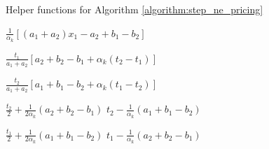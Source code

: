 \documentclass[10pt,a4paper]{book}
\theoremstyle{definition}
\theoremstyle{comment}
\begin{document}
\begin{algorithm}
	\caption{Helper functions for Algorithm \ref{algorithm:step_ne_pricing}}
	\label{algorithm:step_helper_functions}
	\begin{algorithmic}[1]
		 \label{function:toll_diff}
		\State \Return $\frac{1}{\alpha_k}[(a_1 + a_2) x_1 - a_2 + b_1 - b_2]$
		\EndFunction

		\Statex
		 \label{function:profit_1}
		\State \Return $\frac{t_1}{a_1 + a_2} [a_2 + b_2 - b_1 + \alpha_k (t_2 - t_1)]$
		\EndFunction

		\Statex
		 \label{function:profit_2}
		\State \Return $\frac{t_2}{a_1 + a_2} [a_1 + b_1 - b_2 + \alpha_k (t_1 - t_2)]$
		\EndFunction

		\Statex
		 \label{function:best_response_1}
		\State \Return $\frac{t_2}{2} + \frac{1}{2 \alpha_k}(a_2 + b_2 - b_1)$
		\Else
		\State \Return $t_2 - \frac{1}{\alpha_k}(a_1 + b_1 - b_2)$
		\EndIf
		\EndFunction

		\Statex
		 \label{function:best_response_2}
		\State \Return $\frac{t_1}{2} + \frac{1}{2 \alpha_k}(a_1 + b_1 - b_2)$
		\Else
		\State \Return $t_1 - \frac{1}{\alpha_k}(a_2 + b_2 - b_1)$
		\EndIf
		\EndFunction
	\end{algorithmic}
\end{algorithm}
\end{document}
